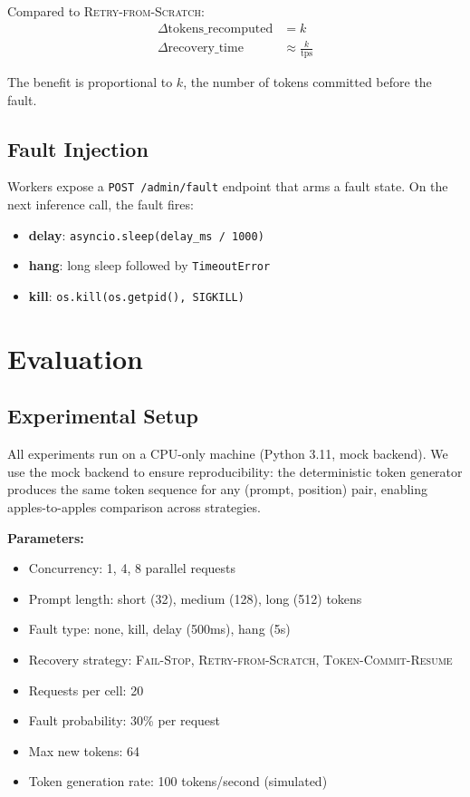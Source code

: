 \documentclass[10pt,twocolumn]{article}
\newcommand{\failstop}{\textsc{Fail-Stop}}
\newcommand{\retry}{\textsc{Retry-from-Scratch}}
\newcommand{\tcr}{\textsc{Token-Commit-Resume}}
\begin{document}
Compared to \retry{}:
\begin{align}
\Delta\text{tokens\_recomputed} &= k \\
\Delta\text{recovery\_time} &\approx \frac{k}{\text{tps}}
\end{align}

The benefit is proportional to $k$, the number of tokens committed before the fault.

\subsection{Fault Injection}

Workers expose a \texttt{POST /admin/fault} endpoint that arms a fault state.
On the next inference call, the fault fires:

\begin{itemize}[leftmargin=*,itemsep=2pt]
  \item \textbf{delay}: \texttt{asyncio.sleep(delay\_ms / 1000)}
  \item \textbf{hang}: long sleep followed by \texttt{TimeoutError}
  \item \textbf{kill}: \texttt{os.kill(os.getpid(), SIGKILL)}
\end{itemize}

\section{Evaluation}
\label{sec:experiments}

\subsection{Experimental Setup}

All experiments run on a CPU-only machine (Python 3.11, mock backend).
We use the mock backend to ensure reproducibility: the deterministic token
generator produces the same token sequence for any (prompt, position) pair,
enabling apples-to-apples comparison across strategies.

\textbf{Parameters:}
\begin{itemize}[leftmargin=*,itemsep=2pt]
  \item Concurrency: 1, 4, 8 parallel requests
  \item Prompt length: short (32), medium (128), long (512) tokens
  \item Fault type: none, kill, delay (500ms), hang (5s)
  \item Recovery strategy: \failstop{}, \retry{}, \tcr{}
  \item Requests per cell: 20
  \item Fault probability: 30\% per request
  \item Max new tokens: 64
  \item Token generation rate: 100 tokens/second (simulated)
\end{itemize}
\end{document}
